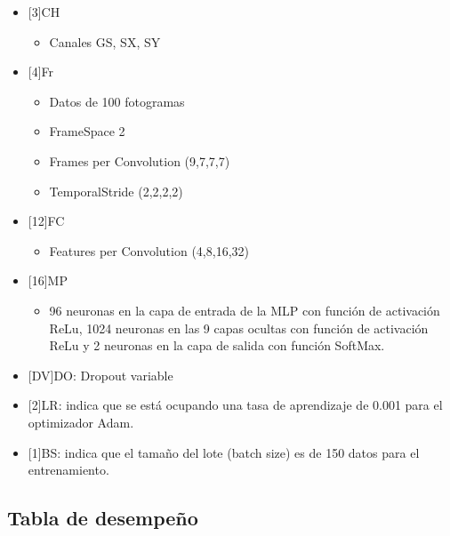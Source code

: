 \begin{onehalfspacing}
\begin{itemize}
    \item {[3]CH}
        \begin{itemize}
            \item Canales GS, SX, SY
    \end{itemize}

    \item {[4]Fr}
        \begin{itemize}
            \item Datos de 100 fotogramas
            \item FrameSpace 2
            \item Frames per Convolution (9,7,7,7)
            \item TemporalStride (2,2,2,2)
    \end{itemize}
    
    \item {[12]FC}
        \begin{itemize}
            \item Features per Convolution (4,8,16,32)
    \end{itemize}
    
    \item {[16]MP}
        \begin{itemize}
            \item 96 neuronas en la capa de entrada de la MLP con función de activación ReLu, 1024 neuronas en las 9 capas ocultas con función de activación ReLu y 2 neuronas en la capa de salida con función SoftMax.
    \end{itemize}
    
    \item {[DV]DO}: Dropout variable
    
    \item {[2]LR}: indica que se está ocupando una tasa de aprendizaje de 0.001 para el optimizador Adam.
    
     \item {[1]BS}: indica que el tamaño del lote (batch size) es de 150 datos para el entrenamiento.
\end{itemize}



\subsection{Tabla de desempeño}
\label{sec:TDesempeno3DLargeFramesMultiChannelsDV}


\end{onehalfspacing}
